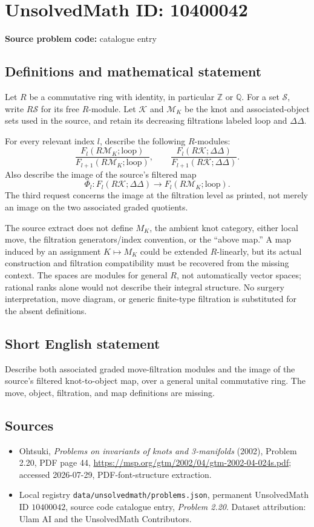 \documentclass[11pt]{article}
\begin{document}
\section*{UnsolvedMath ID: 10400042}
\textbf{Source problem code:} catalogue entry
\subsection{Definitions and mathematical statement}
Let $R$ be a commutative ring with identity, in particular $\mathbb Z$ or $\mathbb Q$. For a set $\mathcal S$, write $R\mathcal S$ for its free $R$-module. Let $\mathcal K$ and $\mathcal M_K$ be the knot and associated-object sets used in the source, and retain its decreasing filtrations labeled loop and $\Delta\Delta$.

For every relevant index $l$, describe the following $R$-modules:
\[
\frac{F_l(R\mathcal M_K;\mathrm{loop})}{F_{l+1}(R\mathcal M_K;\mathrm{loop})},
\qquad
\frac{F_l(R\mathcal K;\Delta\Delta)}{F_{l+1}(R\mathcal K;\Delta\Delta)}.
\]
Also describe the image of the source's filtered map
\[
\Phi_l:F_l(R\mathcal K;\Delta\Delta)
\longrightarrow F_l(R\mathcal M_K;\mathrm{loop}).
\]
The third request concerns the image at the filtration level as printed, not merely an image on the two associated graded quotients.

The source extract does not define $M_K$, the ambient knot category, either local move, the filtration generators/index convention, or the ``above map.'' A map induced by an assignment $K\mapsto M_K$ could be extended $R$-linearly, but its actual construction and filtration compatibility must be recovered from the missing context. The spaces are modules for general $R$, not automatically vector spaces; rational ranks alone would not describe their integral structure. No surgery interpretation, move diagram, or generic finite-type filtration is substituted for the absent definitions.
\subsection{Short English statement}
Describe both associated graded move-filtration modules and the image of the source's filtered knot-to-object map, over a general unital commutative ring. The move, object, filtration, and map definitions are missing.
\subsection{Sources}
\begin{itemize}
\item Ohtsuki, \emph{Problems on invariants of knots and 3-manifolds} (2002), Problem 2.20, PDF page 44, \url{https://msp.org/gtm/2002/04/gtm-2002-04-024s.pdf}; accessed 2026-07-29, PDF-font-structure extraction.
\item Local registry \texttt{data/unsolvedmath/problems.json}, permanent UnsolvedMath ID $10400042$, source code catalogue entry, \emph{Problem 2.20}. Dataset attribution: Ulam AI and the UnsolvedMath Contributors.
\end{itemize}
\end{document}
